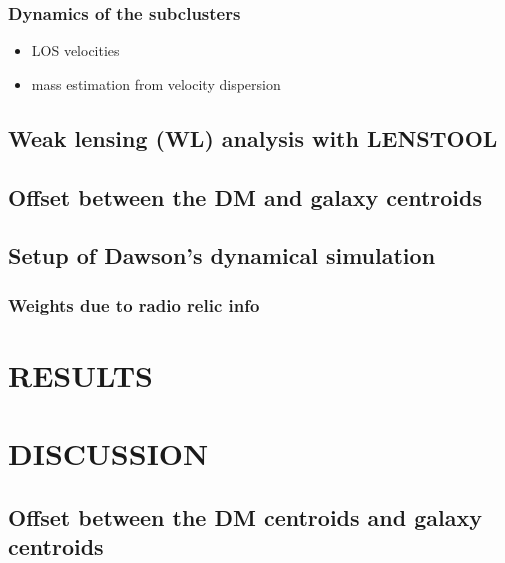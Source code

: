 \documentclass[letterpaper,useAMS,usenatbib]{mn2e}
\begin{document}
\subsubsection{Dynamics of the subclusters}
\begin{itemize}
		\item LOS velocities
		\item mass estimation from velocity dispersion 
\end{itemize}

\subsection{Weak lensing (WL) analysis with LENSTOOL}


\subsection{Offset between the DM and galaxy centroids}

\subsection{Setup of Dawson's dynamical simulation}
\subsubsection{Weights due to radio relic info}

\section{RESULTS}




\section{DISCUSSION}
\subsection{Offset between the DM centroids and galaxy centroids}
\end{document}
